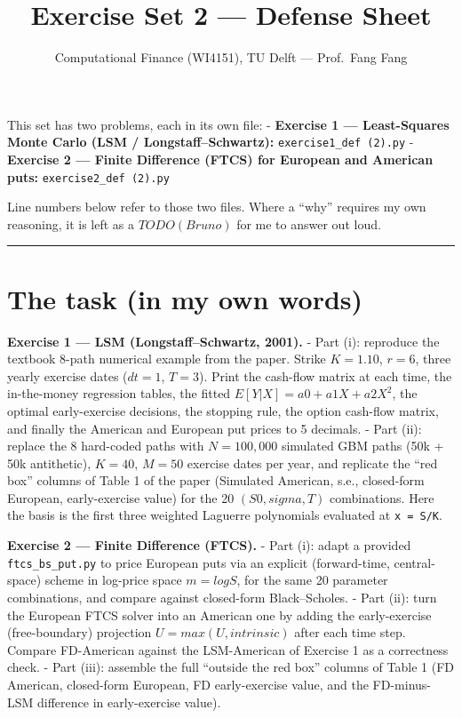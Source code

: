 \documentclass[
  11pt,
]{article}
\title{Exercise Set 2 --- Defense Sheet}
\author{Computational Finance (WI4151), TU Delft --- Prof.~Fang Fang}
\date{}
\begin{document}
\maketitle

{
\hypersetup{linkcolor=blue}
\setcounter{tocdepth}{3}
\tableofcontents
}
This set has two problems, each in its own file: - \textbf{Exercise 1
--- Least-Squares Monte Carlo (LSM / Longstaff--Schwartz):}
\texttt{exercise1\_def\ (2).py} - \textbf{Exercise 2 --- Finite
Difference (FTCS) for European and American puts:}
\texttt{exercise2\_def\ (2).py}

Line numbers below refer to those two files. Where a ``why'' requires my
own reasoning, it is left as a \(TODO (Bruno)\) for me to answer out
loud.

\begin{center}\rule{0.5\linewidth}{0.5pt}\end{center}

\hypertarget{the-task-in-my-own-words}{%
\section{The task (in my own words)}\label{the-task-in-my-own-words}}

\textbf{Exercise 1 --- LSM (Longstaff--Schwartz, 2001).} - Part (i):
reproduce the textbook 8-path numerical example from the paper. Strike
\(K = 1.10\), \(r = 6%
\), three yearly exercise dates (\(dt = 1\), \(T = 3\)). Print the
cash-flow matrix at each time, the in-the-money regression tables, the
fitted \(E[Y|X] = a0 + a1 X + a2 X^2\), the optimal early-exercise
decisions, the stopping rule, the option cash-flow matrix, and finally
the American and European put prices to 5 decimals. - Part (ii): replace
the 8 hard-coded paths with \(N = 100,000\) simulated GBM paths (50k +
50k antithetic), \(K = 40\), \(M = 50\) exercise dates per year, and
replicate the ``red box'' columns of Table 1 of the paper (Simulated
American, s.e., closed-form European, early-exercise value) for the 20
\((S0, sigma, T)\) combinations. Here the basis is the first three
weighted Laguerre polynomials evaluated at \texttt{x\ =\ S/K}.

\textbf{Exercise 2 --- Finite Difference (FTCS).} - Part (i): adapt a
provided \texttt{ftcs\_bs\_put.py} to price European puts via an
explicit (forward-time, central-space) scheme in log-price space
\(m = log S\), for the same 20 parameter combinations, and compare
against closed-form Black--Scholes. - Part (ii): turn the European FTCS
solver into an American one by adding the early-exercise (free-boundary)
projection \(U = max(U, intrinsic)\) after each time step. Compare
FD-American against the LSM-American of Exercise 1 as a correctness
check. - Part (iii): assemble the full ``outside the red box'' columns
of Table 1 (FD American, closed-form European, FD early-exercise value,
and the FD-minus-LSM difference in early-exercise value).
\end{document}
